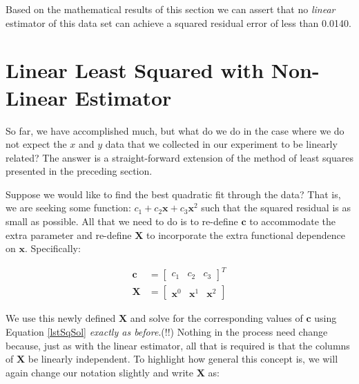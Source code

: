 Based on the mathematical results of this section we can
assert that no \emph{linear} estimator of this data set can
achieve a squared residual error of less than 0.0140.

\section{Linear Least Squared with Non-Linear Estimator}

So far, we have accomplished much, but what do we do in the case where we do
not expect the $x$ and $y$ data that we collected in our experiment to be
linearly related?  The answer is a straight-forward
extension of the method of least squares presented in the preceding section.  

Suppose we would like to find the best quadratic fit through the data?  That
is, we are seeking some function: $c_{1} + c_{2}\mathbf{x} + c_{3}
\mathbf{x}^{2}$ such that the squared residual is as small as possible.  All
that we need to do is to re-define $\mathbf{c}$ to accommodate the extra
parameter and re-define $\mathbf{X}$ to incorporate the extra functional dependence on $\mathbf{x}$.  Specifically:

\begin{equation}
\begin{split}
\mathbf{c} &= 
\left[
\begin{matrix}
c_{1} & c_{2} & c_{3} 
\end{matrix}
\right]^{T} \\
\mathbf{X} &= 
\left[
\begin{matrix}
\mathbf{x}^{0} & \mathbf{x}^{1} & \mathbf{x}^{2}
\end{matrix}
\right]
\end{split}
\label{bestQuad}
\end{equation}

We use this newly defined $\mathbf{X}$ and solve for the corresponding values
of $\mathbf{c}$ using Equation \ref{lstSqSol} \emph{exactly as before}.(!!) Nothing in the process need change because, just as with the linear estimator, all that is required is that the columns of $\mathbf{X}$ be linearly independent. To highlight how general this concept is, we will again change our notation slightly and write $\mathbf{X}$ as:

